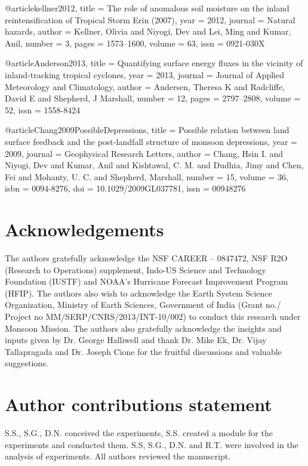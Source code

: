 \documentclass[fleqn,10pt]{wlscirep}
\begin{document}
{@article{kellner2012,
    title = {{The role of anomalous soil moisture on the inland reintensification of Tropical Storm Erin (2007)}},
    year = {2012},
    journal = {Natural hazards},
    author = {Kellner, Olivia and Niyogi, Dev and Lei, Ming and Kumar, Anil},
    number = {3},
    pages = {1573--1600},
    volume = {63},
    issn = {0921-030X}
}

@article{Anderson2013,
    title = {{Quantifying surface energy fluxes in the vicinity of inland-tracking tropical cyclones}},
    year = {2013},
    journal = {Journal of Applied Meteorology and Climatology},
    author = {Andersen, Theresa K and Radcliffe, David E and Shepherd, J Marshall},
    number = {12},
    pages = {2797--2808},
    volume = {52},
    issn = {1558-8424}
}

@article{Chang2009PossibleDepressions,
    title = {{Possible relation between land surface feedback and the post-landfall structure of monsoon depressions}},
    year = {2009},
    journal = {Geophysical Research Letters},
    author = {Chang, Hsin I. and Niyogi, Dev and Kumar, Anil and Kishtawal, C. M. and Dudhia, Jimy and Chen, Fei and Mohanty, U. C. and Shepherd, Marshall},
    number = {15},
    volume = {36},
    isbn = {0094-8276},
    doi = {10.1029/2009GL037781},
    issn = {00948276}
}}


\section*{Acknowledgements}

The authors gratefully acknowledge the NSF CAREER – 0847472, NSF R2O (Research to Operations) supplement, Indo-US Science and Technology Foundation (IUSTF) and NOAA’s Hurricane Forecast Improvement Program (HFIP). The authors also wish to acknowledge the Earth System Science Organization, Ministry of Earth Sciences, Government of India (Grant no./ Project no MM/SERP/CNRS/2013/INT-10/002) to conduct this research under Monsoon Mission. The authors also gratefully acknowledge the insights and inputs given by Dr. George Halliwell and thank Dr. Mike Ek, Dr. Vijay Tallapragada and Dr. Joseph Cione for the fruitful discussions and valuable suggestions.

\section*{Author contributions statement}

S.S., S.G., D.N. conceived the experiments, S.S. created a module for the experiments and conducted them. S.S, S.G., D.N. and R.T. were involved in the analysis of experiments. All authors reviewed the manuscript. 
\end{document}

